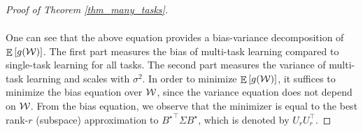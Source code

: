 \begin{proof}[Proof of Theorem \ref{thm_many_tasks}]
\begin{align*}
	\end{align*}
\iffalse
{\color{red}
\begin{align*}
	f(W_1, \dots, W_t) = \sum_{i=1}^t \bignorm{X \hat B W_i - Y_i}^2 = \val(\cal W) \cdot \left( 1+\OO(p^{-1/2+\e})\right),
\end{align*}
where
\begin{align*}
	 \val(\cal W) &= \sum_{i=1}^t  \bignorm{X\bigbrace{(B^\star \cal W^\top) (\cal W\cal W^{\top})^{-1} W_i - \beta_i}}^2 + \E_{\e_i:1\le i \le t}\sum_{i=1}^t\left\| X(X^{\top}X)^{-1}X^{\top} \bigbrace{\sum_{i=1}^t \varepsilon_i W_i^{\top}} (\cal W \cal W^{\top})^{-1}W_i -\e_i\right\| \\
	 &= \sum_{i=1}^t  \bignorm{X\bigbrace{(B^\star \cal W^\top) (\cal W\cal W^{\top})^{-1} W_i - \beta_i}}^2 + \sigma^2 (nt-pr).
\end{align*}

}
\fi
	One can see that the above equation provides a bias-variance decomposition of $\ex{g(\cW)}$.
	The first part measures the bias of multi-task learning compared to single-task learning for all tasks.
	The second part measures the variance of multi-task learning and scales with $\sigma^2$.
	In order to minimize $\ex{g(\cW)}$, it suffices to minimize the bias equation over $\cal W$, since the variance equation does not depend on $\cal W$.
	From the bias equation, we observe that the minimizer is equal to the best rank-$r$ (subspace) approximation to ${B^{\star}}^{\top} \Sigma B^{\star}$, which is denoted by $U_{r} U_r^{\top}$.


\end{proof}
